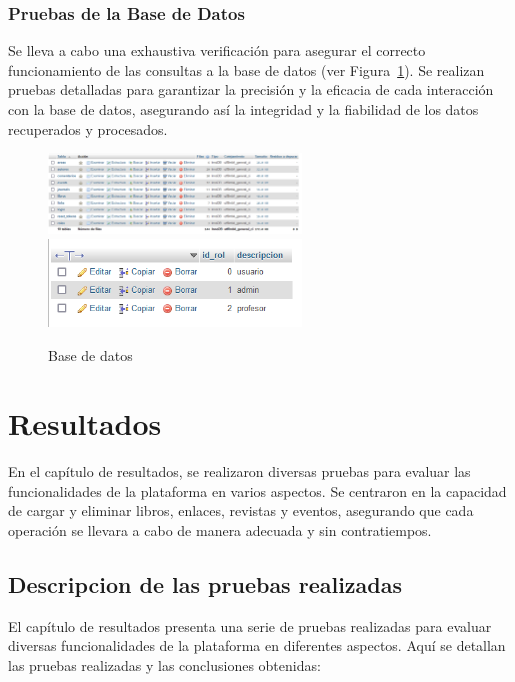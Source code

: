 \documentclass[a4paper, 12pt]{book}
\begin{document}
\subsection{Pruebas de la Base de Datos}
\label{sec:base_datos}
Se lleva a cabo una exhaustiva verificación para asegurar el correcto funcionamiento de las consultas a la base de datos 
(ver Figura~\ref{fig:db}). Se realizan pruebas detalladas para garantizar la precisión y la eficacia de cada interacción 
con la base de datos, asegurando así la integridad y la fiabilidad de los datos recuperados y procesados.

\begin{figure}
  \centering
  \includegraphics[width=0.6\textwidth]{img/db.png}
  \includegraphics[width=0.6\textwidth]{img/roldb.png}
  \caption{Base de datos}
  \label{fig:db}
\end{figure}



\cleardoublepage
\chapter{Resultados}
\label{chap:resultados}

En el capítulo de resultados, se realizaron diversas pruebas para evaluar las funcionalidades de la plataforma en varios aspectos. Se centraron en la 
capacidad de cargar y eliminar libros, enlaces, revistas y eventos, asegurando que cada operación se llevara a cabo de manera adecuada y sin contratiempos.

\section{Descripcion de las pruebas realizadas}
\label{sec:pruebas}
El capítulo de resultados presenta una serie de pruebas realizadas para evaluar diversas funcionalidades de la plataforma en diferentes aspectos. Aquí se detallan las 
pruebas realizadas y las conclusiones obtenidas:
\end{document}
